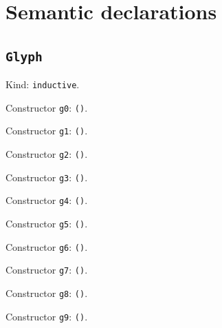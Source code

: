 \documentclass[11pt]{article}
\begin{document}
\section*{Semantic declarations}
\subsection*{\texttt{Glyph}}
\noindent Kind: \texttt{inductive}.\par
\noindent Constructor \texttt{g0}: \texttt{()}.\par
\noindent Constructor \texttt{g1}: \texttt{()}.\par
\noindent Constructor \texttt{g2}: \texttt{()}.\par
\noindent Constructor \texttt{g3}: \texttt{()}.\par
\noindent Constructor \texttt{g4}: \texttt{()}.\par
\noindent Constructor \texttt{g5}: \texttt{()}.\par
\noindent Constructor \texttt{g6}: \texttt{()}.\par
\noindent Constructor \texttt{g7}: \texttt{()}.\par
\noindent Constructor \texttt{g8}: \texttt{()}.\par
\noindent Constructor \texttt{g9}: \texttt{()}.\par
\end{document}
